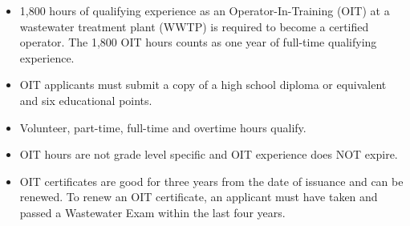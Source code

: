 \begin{itemize}
\scriptsize
\item 1,800 hours of qualifying experience as an Operator-In-Training (OIT)  at a wastewater treatment plant (WWTP) is required to become a certified operator. The 1,800 OIT hours counts as one year of full-time qualifying experience.
\item OIT applicants must submit a copy of a high school diploma or equivalent and six educational points.
\item Volunteer, part-time, full-time and overtime hours qualify.
\item OIT hours are not grade level specific and OIT experience does NOT expire.
\item OIT certificates are good for three years from the date of issuance and can be renewed.  To renew an OIT certificate, an applicant must have taken and passed a Wastewater Exam within the last four years.
\end{itemize}
\newpage
